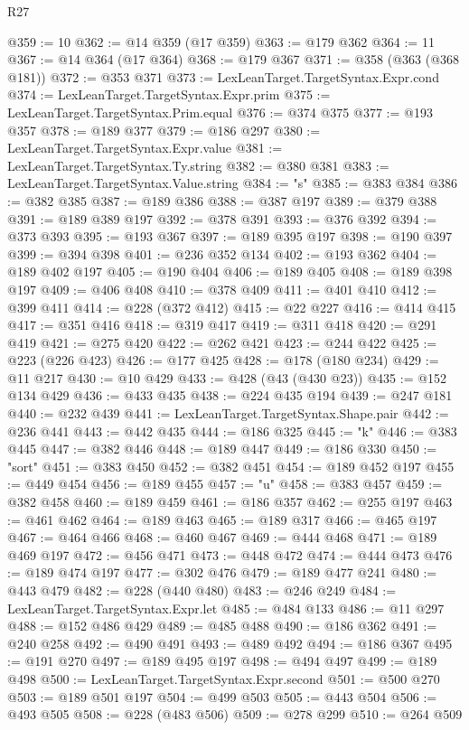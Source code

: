 \begin{lexlean}{R27}
\begin{coremodule}
@359 := 10
@362 := @14 @359 (@17 @359)
@363 := @179 @362
@364 := 11
@367 := @14 @364 (@17 @364)
@368 := @179 @367
@371 := @358 (@363 (@368 @181))
@372 := @353 @371
@373 := LexLeanTarget.TargetSyntax.Expr.cond
@374 := LexLeanTarget.TargetSyntax.Expr.prim
@375 := LexLeanTarget.TargetSyntax.Prim.equal
@376 := @374 @375
@377 := @193 @357
@378 := @189 @377
@379 := @186 @297
@380 := LexLeanTarget.TargetSyntax.Expr.value
@381 := LexLeanTarget.TargetSyntax.Ty.string
@382 := @380 @381
@383 := LexLeanTarget.TargetSyntax.Value.string
@384 := "s"
@385 := @383 @384
@386 := @382 @385
@387 := @189 @386
@388 := @387 @197
@389 := @379 @388
@391 := @189 @389 @197
@392 := @378 @391
@393 := @376 @392
@394 := @373 @393
@395 := @193 @367
@397 := @189 @395 @197
@398 := @190 @397
@399 := @394 @398
@401 := @236 @352 @134
@402 := @193 @362
@404 := @189 @402 @197
@405 := @190 @404
@406 := @189 @405
@408 := @189 @398 @197
@409 := @406 @408
@410 := @378 @409
@411 := @401 @410
@412 := @399 @411
@414 := @228 (@372 @412)
@415 := @22 @227
@416 := @414 @415
@417 := @351 @416
@418 := @319 @417
@419 := @311 @418
@420 := @291 @419
@421 := @275 @420
@422 := @262 @421
@423 := @244 @422
@425 := @223 (@226 @423)
@426 := @177 @425
@428 := @178 (@180 @234)
@429 := @11 @217
@430 := @10 @429
@433 := @428 (@43 (@430 @23))
@435 := @152 @134 @429
@436 := @433 @435
@438 := @224 @435 @194
@439 := @247 @181
@440 := @232 @439
@441 := LexLeanTarget.TargetSyntax.Shape.pair
@442 := @236 @441
@443 := @442 @435
@444 := @186 @325
@445 := "k"
@446 := @383 @445
@447 := @382 @446
@448 := @189 @447
@449 := @186 @330
@450 := "sort"
@451 := @383 @450
@452 := @382 @451
@454 := @189 @452 @197
@455 := @449 @454
@456 := @189 @455
@457 := "u"
@458 := @383 @457
@459 := @382 @458
@460 := @189 @459
@461 := @186 @357
@462 := @255 @197
@463 := @461 @462
@464 := @189 @463
@465 := @189 @317
@466 := @465 @197
@467 := @464 @466
@468 := @460 @467
@469 := @444 @468
@471 := @189 @469 @197
@472 := @456 @471
@473 := @448 @472
@474 := @444 @473
@476 := @189 @474 @197
@477 := @302 @476
@479 := @189 @477 @241
@480 := @443 @479
@482 := @228 (@440 @480)
@483 := @246 @249
@484 := LexLeanTarget.TargetSyntax.Expr.let
@485 := @484 @133
@486 := @11 @297
@488 := @152 @486 @429
@489 := @485 @488
@490 := @186 @362
@491 := @240 @258
@492 := @490 @491
@493 := @489 @492
@494 := @186 @367
@495 := @191 @270
@497 := @189 @495 @197
@498 := @494 @497
@499 := @189 @498
@500 := LexLeanTarget.TargetSyntax.Expr.second
@501 := @500 @270
@503 := @189 @501 @197
@504 := @499 @503
@505 := @443 @504
@506 := @493 @505
@508 := @228 (@483 @506)
@509 := @278 @299
@510 := @264 @509

\end{coremodule}
\end{lexlean}

